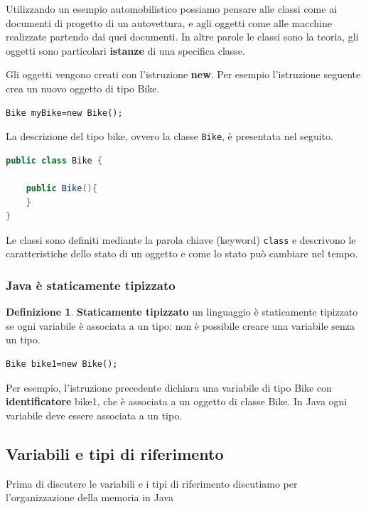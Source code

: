 \documentclass{article}
\theoremstyle{definition}
\newtheorem{mydef}{Definizione}
\begin{document}
Utilizzando un esempio automobilistico possiamo pensare alle classi come ai documenti di progetto di un autovettura, e agli oggetti come alle macchine realizzate partendo dai quei documenti. In altre parole le classi sono la teoria, gli oggetti sono particolari \textbf{istanze} di una specifica classe. 

Gli oggetti vengono creati con l'istruzione \textbf{new}. Per esempio l'istruzione seguente crea un nuovo oggetto di tipo Bike. 
\begin{lstlisting}
Bike myBike=new Bike();
\end{lstlisting}
La descrizione del tipo bike, ovvero la classe \texttt{Bike}, \`e presentata nel seguito.
\begin{lstlisting}[language=Java,escapechar=|]
public class Bike {

	public Bike(){
	}
}
\end{lstlisting}
Le classi sono definiti mediante la parola chiave (keyword) \texttt{class} e descrivono le caratteristiche dello stato di un oggetto e come lo stato pu\`o cambiare nel tempo.


\subsubsection{Java \`e staticamente tipizzato}
\begin{mydef} \textbf{Staticamente tipizzato} un linguaggio \`e staticamente tipizzato se ogni variabile \`e associata a un tipo: non \`e possibile creare una variabile senza un tipo.
\end{mydef}
\begin{lstlisting}
Bike bike1=new Bike();
\end{lstlisting}
Per esempio, l'istruzione precedente dichiara una variabile di tipo Bike con \textbf{identificatore} bike1, che \`e associata a un oggetto di classe Bike. 
In Java ogni variabile deve essere associata a un tipo.


\subsection{Variabili e tipi di riferimento}
Prima di discutere le variabili e i tipi di riferimento discutiamo per l'organizzazione della memoria in Java 
\end{document}
